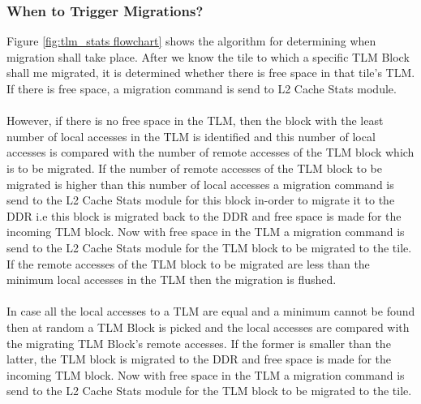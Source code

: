 \documentclass{listhesis}
\begin{document}
\subsubsection{When to Trigger Migrations?}
Figure \ref{fig:tlm_stats flowchart} shows the algorithm for determining when migration shall take place. After we know the tile to which a specific TLM Block shall me migrated, it is determined whether there is free space in that tile's TLM. If there is free space, a migration command is send to L2 Cache Stats module. \\
\\
However, if there is no free space in the TLM, then the block with the least number of local accesses in the TLM is identified and this number of local accesses is compared with the number of remote accesses of the TLM block which is to be migrated. If the number of remote accesses of the TLM block to be migrated is higher than this number of local accesses a migration command is send to the L2 Cache Stats module for this block in-order to migrate it to the DDR i.e this block is migrated back to the DDR and free space is made for the incoming TLM block. Now with free space in the TLM a migration command is send to the  L2 Cache Stats module for the TLM block to be migrated to the tile. If the remote accesses of the TLM block to be migrated are less than the minimum local accesses in the TLM then the migration is flushed.\\
\\
In case all the local accesses to a TLM are equal and a minimum cannot be found then at random a TLM Block is picked and the local accesses are compared with the migrating TLM Block's remote accesses. If the former is smaller than the latter, the TLM block is migrated to the DDR and free space is made for the incoming TLM block. Now with free space in the TLM a migration command is send to the  L2 Cache Stats module for the TLM block to be migrated to the tile. \\
\end{document}

